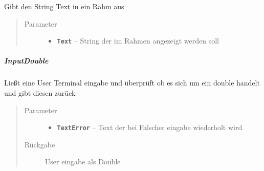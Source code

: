 \documentclass[letterpaper,10pt,ngerman]{sphinxmanual}
\begin{document}
\begin{fulllineitems}
\label{com/linuxluigi/polynomial/TerminalInterface:com.linuxluigi.polynomial.TerminalInterface.BoarderText(String)}
Gibt den String Text in ein Rahm aus
\begin{quote}\begin{description}
\item[{Parameter}] \leavevmode\begin{itemize}
\item {} 
\textbf{\texttt{Text}} -- String der im Rahmen angezeigt werden soll

\end{itemize}

\end{description}\end{quote}

\end{fulllineitems}



\subparagraph{InputDouble}
\label{com/linuxluigi/polynomial/TerminalInterface:inputdouble}

\begin{fulllineitems}
\label{com/linuxluigi/polynomial/TerminalInterface:com.linuxluigi.polynomial.TerminalInterface.InputDouble(String)}
Ließt eine User Terminal eingabe und überprüft ob es sich um ein double handelt und gibt diesen zurück
\begin{quote}\begin{description}
\item[{Parameter}] \leavevmode\begin{itemize}
\item {} 
\textbf{\texttt{TextError}} -- Text der bei Falscher eingabe wiederholt wird

\end{itemize}

\item[{Rückgabe}] \leavevmode
User eingabe als Double

\end{description}\end{quote}

\end{fulllineitems}
\end{document}
